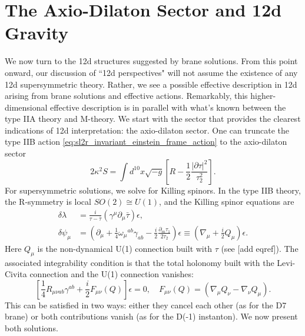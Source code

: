 \section{The Axio-Dilaton Sector and 12d Gravity}
We now turn to the 12d structures suggested by brane solutions.
From this point onward, our discussion of ``12d perspectives" will not assume the existence of any 12d supersymmetric theory.
Rather, we see a possible effective description in 12d arising from brane solutions and effective actions.
Remarkably, this higher-dimensional effective description is in parallel with what's known between the type IIA theory and M-theory.
We start with the sector that provides the clearest indications of 12d interpretation: the axio-dilaton sector.
One can truncate the type IIB action \eqref{eq:sl2r_invariant_einstein_frame_action} to the axio-dilaton sector
\begin{equation}
2\kappa^2S=
\int d^{10}x\sqrt{-g}\left[
R-\frac{1}{2}\frac{|\partial \tau|^2}{\tau_2^2}
\right].
\label{IIB axio-dilaton action}
\end{equation}
For supersymmetric solutions, we solve for Killing spinors.
In the type IIB theory, the R-symmetry is local $SO(2)\cong U(1)$, and the Killing spinor equations are \cite{Bergshoeff:2006jj}
\begin{equation}
\begin{aligned}
\delta\lambda
&=\frac{i}{\tau-\bar\tau}(\gamma^\mu\partial_\mu \bar\tau)\epsilon,\\
\delta\psi_\mu
&=
\left(
\partial_\mu+\frac{1}{4}\omega_\mu{}^{ab}\gamma_{ab} -\frac{i}{2}\frac{\partial_m \tau_1}{2\tau_2}
\right)\epsilon
\equiv\left(\nabla_\mu+\frac{i}{2}Q_\mu\right)\epsilon.
\end{aligned}
\label{9+1 IIB axio-dilaton Killing spinor equations}
\end{equation}
Here $Q_\mu$ is the non-dynamical U(1) connection built with $\tau$ (see [add eqref]). 
The associated integrability condition is that the total holonomy built with the Levi-Civita connection and the U(1) connection vanishes:
\begin{equation}
\left[\frac{1}{4}R_{\mu\nu ab}\gamma^{ab}
+ \frac{i}{2}F_{\mu\nu}(Q)\right]
\epsilon = 0,\quad
F_{\mu\nu}(Q)=(\nabla_\mu Q_\nu-\nabla_\nu Q_\mu).
\end{equation}
This can be satisfied in two ways: either they cancel each other (as for the D7 brane) or both contributions vanish (as for the D(-1) instanton).
We now present both solutions.

